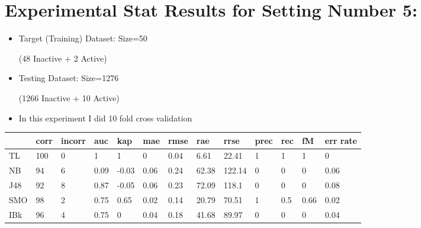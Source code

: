 \documentclass[a4paper,12pt, english]{article}
\begin{document}
\section{Experimental Stat Results for Setting Number 5:}
\begin{itemize}
\item Target (Training) Dataset: Size=50 \begin{scriptsize}(48 Inactive + 2 Active)\end{scriptsize}
\item Testing Dataset: Size=1276 \begin{scriptsize}(1266 Inactive + 10 Active)\end{scriptsize}
\item In this experiment I did 10 fold cross validation
\end{itemize}  

\begin{small}
\begin{center}
    \begin{tabular}{ | l | l | l | l | l | l | l | l | l | l | l | l | l |}
    \hline
      	& corr & incorr  & auc & kap & mae & rmse & rae & rrse & prec & rec & fM & err rate\\ \hline
      	TL & 100 & 0 & 1 & 1 & 0 & 0.04 & 6.61 & 22.41 & 1 & 1 & 1 & 0\\ \hline
	NB & 94 & 6 & 0.09 & -0.03 & 0.06 & 0.24 & 62.38 & 122.14 & 0 & 0 & 0 & 0.06\\ \hline
	J48 & 92 & 8 & 0.87 & -0.05 & 0.06 & 0.23 & 72.09 & 118.1 & 0 & 0 & 0 & 0.08\\ \hline
	SMO & 98 & 2 & 0.75 & 0.65 & 0.02 & 0.14 & 20.79 & 70.51 & 1 & 0.5 & 0.66 & 0.02\\ \hline
	IBk & 96 & 4 & 0.75 & 0 & 0.04 & 0.18 & 41.68 & 89.97 & 0 & 0 & 0 & 0.04\\ \hline  
    \end{tabular}       
\end{center}
\end{small}
\end{document}
